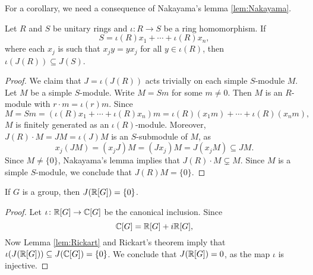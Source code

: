For a corollary, we need a consequence of 
Nakayama's lemma \ref{lem:Nakayama}.


\begin{lemma}
	\label{lem:Rickart}
    Let $R$ and $S$ be unitary rings and 
	$\iota\colon R\to S$ be a ring homomorphism. If  
	\[
	S=\iota(R)x_1+\cdots+\iota(R)x_n,
	\]
	where each $x_j$ is such that
    $x_jy=yx_j$ for all $y\in\iota(R)$, then
	$\iota(J(R))\subseteq J(S)$.
\end{lemma}

\begin{proof}
	We claim that $J=\iota(J(R))$ acts trivially on each simple $S$-module $M$.
	Let $M$ be a simple $S$-module. Write 
    $M=Sm$ for some $m\ne0$. Then $M$ is 
    an $R$-module with $r\cdot m=\iota(r)m$. Since 
    \[
		M=Sm=(\iota(R)x_1+\cdots+\iota(R)x_n)m=\iota(R)(x_1m)+\cdots+\iota(R)(x_nm),
	\]
	$M$ is finitely generated as an $\iota(R)$-module. Moreover, $J(R)\cdot
	M=JM=\iota(J)M$ is an $S$-submodule of $M$, as 
	\[
		x_j(JM)=(x_jJ)M=(Jx_j)M=J(x_jM)\subseteq JM.
	\]
	Since $M\ne\{0\}$, Nakayama's lemma implies that $J(R)\cdot M\subsetneq M$. Since 
	$M$ is a simple $S$-module, we conclude that 
    $J(R)M=\{0\}$.
\end{proof}

\begin{corollary}
	If $G$ is a group, then $J(\mathbb{R}[G])=\{0\}$. 
\end{corollary}

\begin{proof}
	Let $\iota\colon \mathbb{R}[G]\to\mathbb{C}[G]$ be the canonical inclusion. Since 
 	\[
	\mathbb{C}[G]=\mathbb{R}[G]+i\mathbb{R}[G],
	\]
	Now Lemma \ref{lem:Rickart} and Rickart's theorem imply that 
	$\iota(J(\mathbb{R}[G]))\subseteq J(\mathbb{C}[G])=\{0\}$. We conclude that $J(\mathbb{R}[G])=0$, as the map $\iota$ is injective. 
\end{proof}
